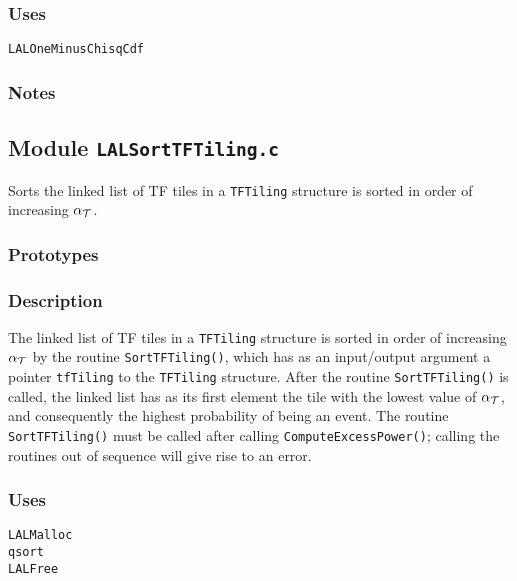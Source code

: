 \subsubsection*{Uses}
\begin{verbatim}
LALOneMinusChisqCdf
\end{verbatim}

\subsubsection*{Notes}

\vfill{\footnotesize}

\newpage
\subsection{Module \texttt{LALSortTFTiling.c}}
\label{ss:LALSortTFTiling.c}

Sorts the linked list of TF tiles in a \verb+TFTiling+ structure is
sorted in order of increasing $\alpha_{\cal T}$.

\subsubsection*{Prototypes}
\vspace{0.1in}


\subsubsection*{Description}

The linked list of TF tiles in a \verb+TFTiling+ structure is sorted in order
of increasing $\alpha_{\cal T}$ by the routine \verb+SortTFTiling()+, which
has as an input/output argument a pointer \verb+tfTiling+ to the
\verb+TFTiling+ structure.  After the routine \verb+SortTFTiling()+ is called,
the linked list has as its first element the tile with the lowest value of
$\alpha_{\cal T}$, and consequently the highest probability of being an event.
The routine \verb+SortTFTiling()+ must be called after calling
\verb+ComputeExcessPower()+; calling the routines out of sequence will give
rise to an error.

\subsubsection*{Uses}
\begin{verbatim}
LALMalloc
qsort
LALFree
\end{verbatim}

